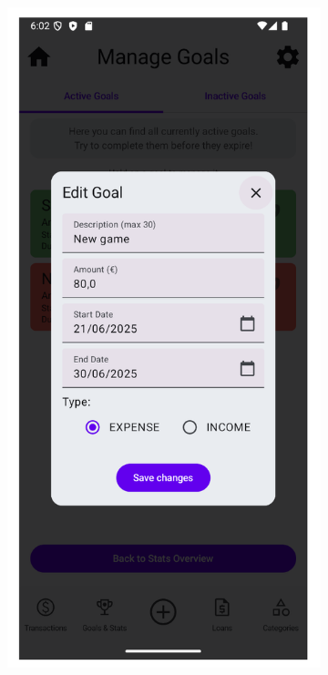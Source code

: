 \documentclass[a4paper,12pt]{article}
\begin{document}
\begin{figure}[H]
    \centering
    \ContinuedFloat %
    \begin{subfigure}[b]{0.23\textwidth}
        \includegraphics[width=\textwidth]{manage_goals_edit_dialog.png}

\end{subfigure}
\end{figure}
\end{document}
